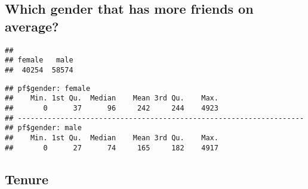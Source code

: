 \documentclass{article}
\begin{document}
\subsection{Which gender that has more friends on average?}
\begin{knitrout}
\color{fgcolor}\begin{kframe}
\begin{alltt}
\hlopt{$}
\end{alltt}
\begin{verbatim}
## 
## female   male 
##  40254  58574
\end{verbatim}
\begin{alltt}
\hlopt{$}\hlopt{$}
\end{alltt}
\begin{verbatim}
## pf$gender: female
##    Min. 1st Qu.  Median    Mean 3rd Qu.    Max. 
##       0      37      96     242     244    4923 
## ------------------------------------------------------------------- 
## pf$gender: male
##    Min. 1st Qu.  Median    Mean 3rd Qu.    Max. 
##       0      27      74     165     182    4917
\end{verbatim}
\end{kframe}
\end{knitrout}

\subsection{Tenure}

\begin{knitrout}
\color{fgcolor}\begin{kframe}
\begin{alltt}
 \hlkwb{<-} \hlstd{(}\hlstd{(} \hlopt{/}\hlstd{),}   \hlopt{+}
    \hlstd{(} \hlstd{=} \hlstd{,}  \hlstd{=} \hlstd{,}  \hlstd{=} \hlstd{)}\hlopt{+}
    \hlstd{(}\hlstd{=}\hlstd{(}\hlstd{,}\hlstd{,}\hlstd{),} \hlstd{=}\hlstd{(}\hlstd{,}\hlstd{))} \hlopt{+}
    \hlstd{(}\hlstd{)} \hlopt{+}
    \hlstd{(}\hlstd{)}
\hlstd{(}\hlstd{)}
\end{alltt}


{\ttfamily\noindent\itshape\color{messagecolor}{\#\# Saving 7 x 7 in image}}\end{kframe}
\end{knitrout}
\end{document}
